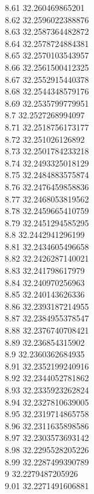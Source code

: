 {8.61	32.260469865201\\
8.62	32.2596022388876\\
8.63	32.2587364482872\\
8.64	32.2578724884381\\
8.65	32.2570103543957\\
8.66	32.2561500412325\\
8.67	32.2552915440378\\
8.68	32.2544348579176\\
8.69	32.2535799779951\\
8.7	32.2527268994097\\
8.71	32.2518756173177\\
8.72	32.251026126892\\
8.73	32.2501784233218\\
8.74	32.2493325018129\\
8.75	32.2484883575874\\
8.76	32.2476459858836\\
8.77	32.2468053819562\\
8.78	32.2459665410759\\
8.79	32.2451294585295\\
8.8	32.2442941296199\\
8.81	32.2434605496658\\
8.82	32.2426287140021\\
8.83	32.241798617979\\
8.84	32.240970256963\\
8.85	32.240143626336\\
8.86	32.2393187214955\\
8.87	32.2384955378547\\
8.88	32.2376740708421\\
8.89	32.236854315902\\
8.9	32.2360362684935\\
8.91	32.2352199240916\\
8.92	32.2344052781862\\
8.93	32.2335923262824\\
8.94	32.2327810639005\\
8.95	32.2319714865758\\
8.96	32.2311635898586\\
8.97	32.2303573693142\\
8.98	32.2295528205226\\
8.99	32.2287499390789\\
9	32.2279487205926\\
9.01	32.2271491606881\\
}
